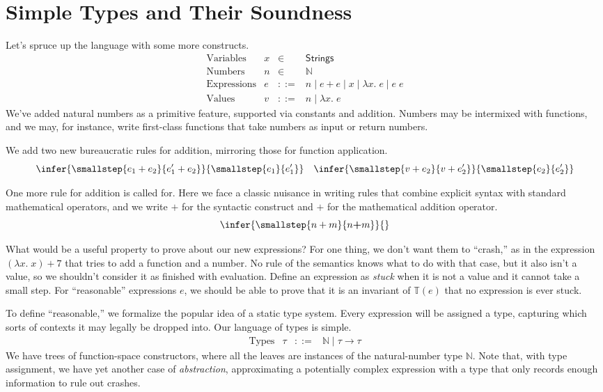 \documentclass{amsbook}
\theoremstyle{definition}
\theoremstyle{remark}
\numberwithin{section}{chapter}
\numberwithin{equation}{chapter}
\begin{document}
\section{Simple Types and Their Soundness}

Let's spruce up the language with some more constructs.
$$\begin{array}{rrcl}
  \textrm{Variables} & x &\in& \mathsf{Strings} \\
  \textrm{Numbers} & n &\in& \mathbb N \\
  \textrm{Expressions} & e &::=& n \mid e + e \mid x \mid \lambda x. \; e \mid e \; e \\
  \textrm{Values} & v &::=& n \mid \lambda x. \; e
\end{array}$$
We've added natural numbers as a primitive feature, supported via constants and addition.
Numbers may be intermixed with functions, and we may, for instance, write first-class functions that take numbers as input or return numbers.

We add two new bureaucratic rules for addition, mirroring those for function application.
$$\infer{\smallstep{e_1 + e_2}{e'_1 + e_2}}{
  \smallstep{e_1}{e'_1}
}
\quad \infer{\smallstep{v + e_2}{v + e'_2}}{
  \smallstep{e_2}{e'_2}
}$$

One more rule for addition is called for.
Here we face a classic nuisance in writing rules that combine explicit syntax with standard mathematical operators, and we write $+$ for the syntactic construct and $\textbf{+}$ for the mathematical addition operator.
$$\infer{\smallstep{n + m}{n \textbf{+} m}}{}$$

What would be a useful property to prove about our new expressions?
For one thing, we don't want them to ``crash,'' as in the expression $(\lambda x. \; x) + 7$ that tries to add a function and a number.
No rule of the semantics knows what to do with that case, but it also isn't a value, so we shouldn't consider it as finished with evaluation.
Define an expression as \emph{stuck} when it is not a value and it cannot take a small step.
For ``reasonable'' expressions $e$, we should be able to prove that it is an invariant of $\mathbb T(e)$ that no expression is ever stuck.

To define ``reasonable,'' we formalize the popular idea of a static type system.
Every expression will be assigned a type, capturing which sorts of contexts it may legally be dropped into.
Our language of types is simple.
\abstraction
$$\begin{array}{rrcl}
  \textrm{Types} & \tau &::=& \mathbb N \mid \tau \to \tau
\end{array}$$
We have trees of function-space constructors, where all the leaves are instances of the natural-number type $\mathbb N$.
Note that, with type assignment, we have yet another case of \emph{abstraction}, approximating a potentially complex expression with a type that only records enough information to rule out crashes.
\end{document}

